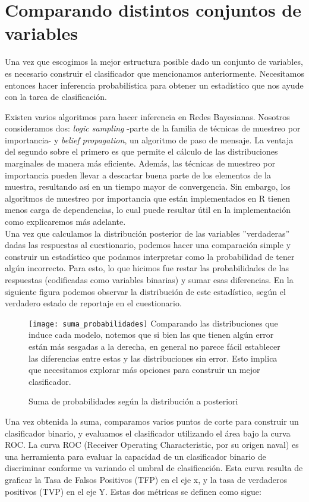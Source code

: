 \section*{Comparando distintos conjuntos de variables}
Una vez que escogimos la mejor estructura posible dado un conjunto de variables, es necesario construir el clasificador que mencionamos anteriormente. Necesitamos entonces hacer inferencia probabilística para obtener un estadístico que nos ayude con la tarea de clasificación.
\par
\noindent
Existen varios algoritmos para hacer inferencia en Redes Bayesianas. Nosotros consideramos dos: \textit{logic sampling} -parte de la familia de técnicas de muestreo por importancia- y \textit{belief propagation}, un algoritmo de paso de mensaje. La ventaja del segundo sobre el primero es que permite el cálculo de las distribuciones marginales de manera más eficiente. Además, las técnicas de muestreo por importancia pueden llevar a descartar buena parte de los elementos de la muestra, resultando así en un tiempo mayor de convergencia. Sin embargo, los algoritmos de muestreo por importancia que están implementados en R tienen menos carga de dependencias, lo cual puede resultar útil en la implementación como explicaremos más adelante.\\
Una vez que calculamos la distribución posterior de las variables ''verdaderas'' dadas las respuestas al cuestionario, podemos hacer una comparación simple y construir un estadístico que podamos interpretar como la probabilidad de tener algún incorrecto. Para esto, lo que hicimos fue restar las probabilidades de las respuestas (codificadas como variables binarias) y sumar esas diferencias. En la siguiente figura podemos observar la distribución de este estadístico, según el verdadero estado de reportaje en el cuestionario.
\begin{figure}[H]
    \caption{Suma de probabilidades según la distribución a posteriori}
    \texttt{[image: suma\_probabilidades]}
    {\footnotesize{Comparando las distribuciones que induce cada modelo, notemos que si bien las que tienen algún error están más sesgadas a la derecha, en general no parece fácil establecer las diferencias entre estas y las distribuciones sin error. Esto implica que necesitamos explorar más opciones para construir un mejor clasificador.}}
\end{figure}
\par
\noindent
Una vez obtenida la suma, comparamos varios puntos de corte para construir un clasificador binario, y evaluamos el clasificador utilizando el área bajo la curva ROC. La curva ROC (Receiver Operating Characteristic, por su origen naval) es una herramienta para evaluar la capacidad de un clasificador binario de discriminar conforme va variando el umbral de clasificación. Esta curva resulta de graficar la Tasa de Falsos Positivos (TFP) en el eje x, y la tasa de verdaderos positivos (TVP) en el eje Y. Estas dos métricas se definen como sigue:
